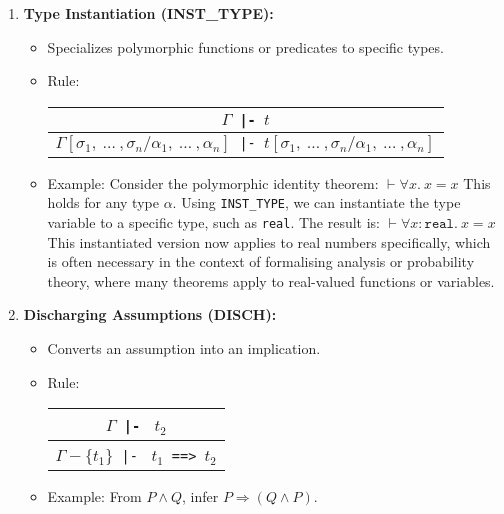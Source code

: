 \begin{enumerate}
    \item \textbf{Type Instantiation (INST\_TYPE):}
    \begin{itemize}
        \item Specializes polymorphic functions or predicates to specific types.
        \item Rule:
          \begin{center}
            \begin{tabular}{c}
              $\Gamma${\small\verb+ |- +}$t$ \\ \hline
              $\Gamma[\sigma_1,\ \ldots\ ,\sigma_n/\alpha_1,\ \ldots\ ,\alpha_n]${\small\verb+ |- +}$t[\sigma_1,\ \ldots\ ,\sigma_n/\alpha_1,\ \ldots\ ,\alpha_n]$
            \end{tabular}
          \end{center}
        \item Example: Consider the polymorphic identity theorem:
          $     \vdash \forall x.\ x = x
          $
          This holds for any type \texttt{$\alpha$}. Using \texttt{INST\_TYPE}, we can instantiate the type variable to a specific type, such as \texttt{real}. The result is:
          $     \vdash \forall x:\texttt{real}.\ x = x
          $
          This instantiated version now applies to real numbers specifically, which is often necessary in the context of formalising analysis or probability theory, where many theorems apply to real-valued functions or variables.
    \end{itemize}

    \item \textbf{Discharging Assumptions (DISCH):}
    \begin{itemize}
        \item Converts an assumption into an implication.
        \item Rule:
          \begin{center}
            \begin{tabular}{c}
              $\Gamma${\small\verb+ |- +} $t_2$ \\ \hline
              $\Gamma{-}\{t_1\}${\small\verb+ |- +} $t_1${\small\verb+ ==> +}$t_2$
            \end{tabular}
          \end{center}
        \item Example: From $P \wedge Q$, infer $P \Rightarrow (Q \wedge P)$.
    \end{itemize}


\end{enumerate}
